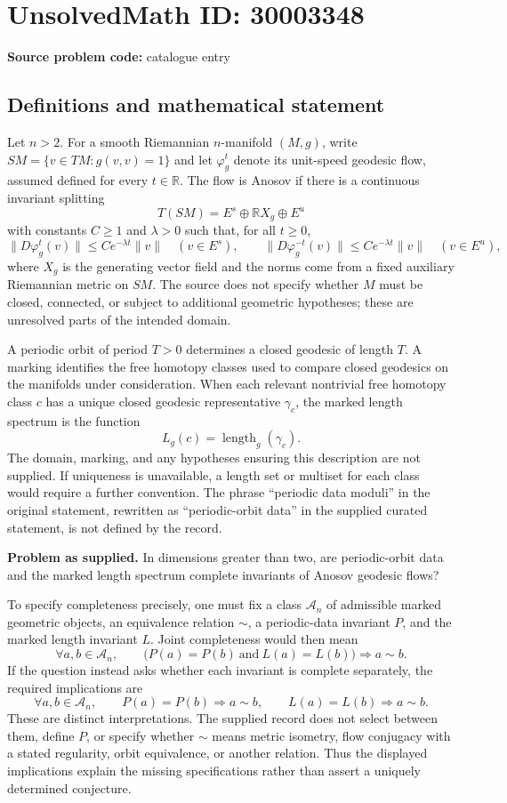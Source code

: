 \documentclass[11pt]{article}
\newcommand{\R}{\mathbb{R}}
\begin{document}
\section*{UnsolvedMath ID: 30003348}
\textbf{Source problem code:} catalogue entry
\subsection{Definitions and mathematical statement}
Let \(n>2\). For a smooth Riemannian \(n\)-manifold \((M,g)\), write \(SM=\{v\in TM:g(v,v)=1\}\) and let \(\varphi_g^t\) denote its unit-speed geodesic flow, assumed defined for every \(t\in\R\). The flow is Anosov if there is a continuous invariant splitting
\[
T(SM)=E^s\oplus\R X_g\oplus E^u
\]
with constants \(C\geq1\) and \(\lambda>0\) such that, for all \(t\geq0\),
\[
\|D\varphi_g^t(v)\|\leq Ce^{-\lambda t}\|v\|\quad(v\in E^s),\qquad
\|D\varphi_g^{-t}(v)\|\leq Ce^{-\lambda t}\|v\|\quad(v\in E^u),
\]
where \(X_g\) is the generating vector field and the norms come from a fixed auxiliary Riemannian metric on \(SM\). The source does not specify whether \(M\) must be closed, connected, or subject to additional geometric hypotheses; these are unresolved parts of the intended domain.

A periodic orbit of period \(T>0\) determines a closed geodesic of length \(T\). A marking identifies the free homotopy classes used to compare closed geodesics on the manifolds under consideration. When each relevant nontrivial free homotopy class \(c\) has a unique closed geodesic representative \(\gamma_c\), the marked length spectrum is the function
\[
L_g(c)=\operatorname{length}_g(\gamma_c).
\]
The domain, marking, and any hypotheses ensuring this description are not supplied. If uniqueness is unavailable, a length set or multiset for each class would require a further convention. The phrase ``periodic data moduli'' in the original statement, rewritten as ``periodic-orbit data'' in the supplied curated statement, is not defined by the record.

\textbf{Problem as supplied.} In dimensions greater than two, are periodic-orbit data and the marked length spectrum complete invariants of Anosov geodesic flows?

To specify completeness precisely, one must fix a class \(\mathcal A_n\) of admissible marked geometric objects, an equivalence relation \(\sim\), a periodic-data invariant \(P\), and the marked length invariant \(L\). Joint completeness would then mean
\[
\forall a,b\in\mathcal A_n,\qquad
\bigl(P(a)=P(b)\ \text{and}\ L(a)=L(b)\bigr)\Longrightarrow a\sim b.
\]
If the question instead asks whether each invariant is complete separately, the required implications are
\[
\forall a,b\in\mathcal A_n,\qquad
P(a)=P(b)\Longrightarrow a\sim b,
\qquad
L(a)=L(b)\Longrightarrow a\sim b.
\]
These are distinct interpretations. The supplied record does not select between them, define \(P\), or specify whether \(\sim\) means metric isometry, flow conjugacy with a stated regularity, orbit equivalence, or another relation. Thus the displayed implications explain the missing specifications rather than assert a uniquely determined conjecture.
\end{document}
